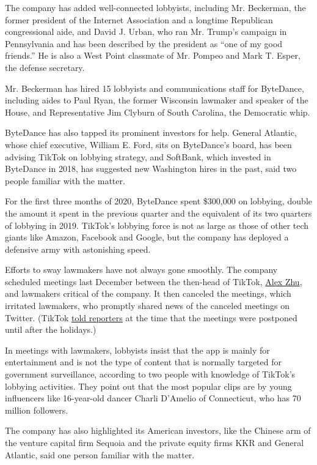 The company has added well-connected lobbyists, including Mr. Beckerman,
the former president of the Internet Association and a longtime
Republican congressional aide, and David J. Urban, who ran Mr. Trump's
campaign in Pennsylvania and has been described by the president as
``one of my good friends.'' He is also a West Point classmate of Mr.
Pompeo and Mark T. Esper, the defense secretary.

Mr. Beckerman has hired 15 lobbyists and communications staff for
ByteDance, including aides to Paul Ryan, the former Wisconsin lawmaker
and speaker of the House, and Representative Jim Clyburn of South
Carolina, the Democratic whip.

ByteDance has also tapped its prominent investors for help. General
Atlantic, whose chief executive, William E. Ford, sits on ByteDance's
board, has been advising TikTok on lobbying strategy, and SoftBank,
which invested in ByteDance in 2018, has suggested new Washington hires
in the past, said two people familiar with the matter.

For the first three months of 2020, ByteDance spent \$300,000 on
lobbying, double the amount it spent in the previous quarter and the
equivalent of its two quarters of lobbying in 2019. TikTok's lobbying
force is not as large as those of other tech giants like Amazon,
Facebook and Google, but the company has deployed a defensive army with
astonishing speed.

Efforts to sway lawmakers have not always gone smoothly. The company
scheduled meetings last December between the then-head of TikTok,
\href{https://www.nytimes.com/2019/11/18/technology/tiktok-alex-zhu-interview.html}{Alex
Zhu}, and lawmakers critical of the company. It then canceled the
meetings, which irritated lawmakers, who promptly shared news of the
canceled meetings on Twitter. (TikTok
\href{https://www.washingtonpost.com/technology/2019/12/09/tiktok-leader-postpones-trip-washington-meet-with-members-congress/}{told
reporters} at the time that the meetings were postponed until after the
holidays.)

In meetings with lawmakers, lobbyists insist that the app is mainly for
entertainment and is not the type of content that is normally targeted
for government surveillance, according to two people with knowledge of
TikTok's lobbying activities. They point out that the most popular clips
are by young influencers like 16-year-old dancer Charli D'Amelio of
Connecticut, who has 70 million followers.

The company has also highlighted its American investors, like the
Chinese arm of the venture capital firm Sequoia and the private equity
firms KKR and General Atlantic, said one person familiar with the
matter.

